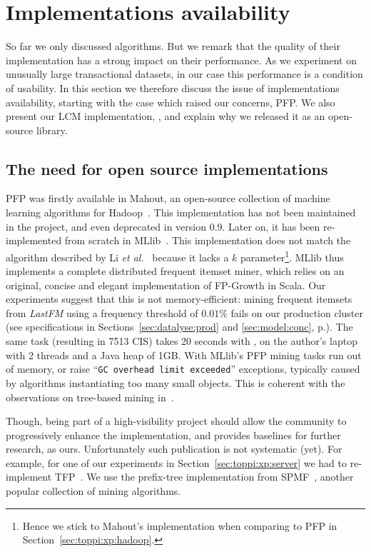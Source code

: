 \section{Implementations availability}
\label{sec:rel:implems}

So far we only discussed algorithms.
But we remark that the quality of their implementation has a strong impact on their performance.
As we experiment on unusually large transactional datasets,
in our case this performance is a condition of usability.
In this section we therefore discuss the issue of implementations availability,
starting with the case which raised our concerns, PFP.
We also present our LCM implementation, \jlcm,
and explain why we released it as an open-source library.


\subsection{The need for open source implementations}

PFP was firstly available in Mahout,
an open-source collection of machine learning algorithms for Hadoop~\cite{mahout}.
This implementation has not been maintained in the project,
and even deprecated in version 0.9.
Later on, it has been re-implemented from scratch in MLlib~\cite{mllib}.
This implementation does not match the algorithm described by Li {\em et al.}~\cite{LiRecSys08}
because it lacks a $k$ parameter\footnote{
Hence we stick to Mahout's implementation when comparing to PFP in Section~\ref{sec:toppi:xp:hadoop}.}.
MLlib thus implements a complete distributed frequent itemset miner,
which relies on an original, concise and elegant implementation of FP-Growth in Scala.
Our experiments suggest that this is not memory-efficient:
mining frequent itemsets from {\em LastFM}
using a frequency threshold of $0.01\%$
fails on our production cluster
(see specifications in Sections~\ref{sec:datalyse:prod} and \ref{sec:model:conc}, p.\pageref{sec:datalyse:prod}).
The same task (resulting in \num{7513} CIS) takes 20 seconds with \jlcm,
on the author's laptop with 2 threads and a Java heap of 1GB.
With MLlib's PFP mining tasks run out of memory,
or raise ``\verb|GC overhead limit exceeded|'' exceptions,
typically caused by algorithms instantiating too many small objects.
This is coherent with the observations on tree-based mining in~\cite{RaczOSDM05, GhotingVLDBJ07}.

Though, being part of a high-visibility project should allow the community to progressively enhance the implementation,
and provides baselines for further research, as ours.
Unfortunately such publication is not systematic (yet).
For example, for one of our experiments in Section~\ref{sec:toppi:xp:server}
we had to re-implement TFP~\cite{HanICDM02}.
We use the prefix-tree implementation from SPMF~\cite{FournierJMLR14},
another popular collection of mining algorithms.


